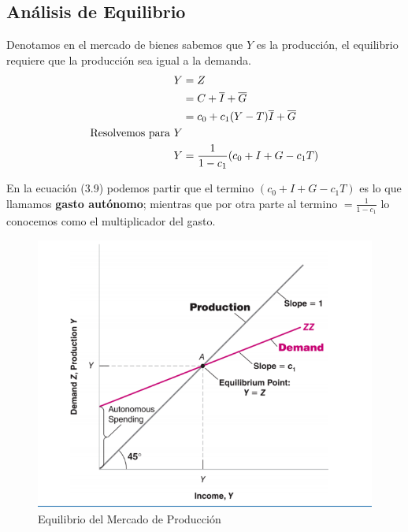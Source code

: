 \subsection{Análisis de Equilibrio}
Denotamos en el mercado de bienes sabemos que $Y$ es la producción, el equilibrio requiere que la producción sea igual a la demanda. 
\begin{align}
    Y &=Z \\
    &=C+\overline{I}+\overline{G}\\
    &= c_{0} + c_{1}(Y-T)\overline{I}+\overline{G}\\
    \textup{Resolvemos para } Y & \nonumber\\
    Y &=\frac{1}{1-c_{1}}(c_{0}+I+G-c_{1}T)
\end{align}
 
En la ecuación (3.9) podemos partir que el termino $(c_{0}+I+G-c_{1}T)$ es lo que llamamos \textbf{gasto autónomo}; mientras que por otra parte  al termino $=\frac{1}{1-c_{1}}$ lo conocemos como el multiplicador del gasto.

\begin{figure}[H]
    \centering
    \includegraphics[scale=0.3]{Images/eq_produccion.png}
    \caption{Equilibrio del Mercado de Producción}
    \label{fig:eq_produccion}
\end{figure}

